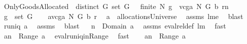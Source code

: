 \begin{isabellebody}
\ OnlyGoodsAllocated{\isacharcolon}\ \ {\isachardoublequoteopen}distinct\ G{\isachardoublequoteclose}\ {\isachardoublequoteopen}set\ G\ {\isasymnoteq}\ {\isacharbraceleft}{\isacharbraceright}{\isachardoublequoteclose}\ {\isachardoublequoteopen}finite\ N{\isachardoublequoteclose}\ {\isachardoublequoteopen}g\ {\isasymin}\ {\isacharparenleft}vcga\ N\ G\ b\ r{\isacharparenright}{\isacharcomma}{\isacharcomma}{\isacharcomma}n{\isachardoublequoteclose}\ \isanewline
{}\ {\isachardoublequoteopen}g\ {\isasymin}\ set\ G{\isachardoublequoteclose}\isanewline
%
\isadelimproof
%
\endisadelimproof
%
\isatagproof
{}\isamarkupfalse%
\ {\isacharminus}\ \isanewline
{}\isamarkupfalse%
\ {\isacharquery}a{\isacharequal}{\isachardoublequoteopen}vcga{\isacharprime}\ N\ G\ b\ r{\isachardoublequoteclose}\ \isamarkupfalse%
\ {\isachardoublequoteopen}{\isacharquery}a\ {\isasymin}\ allocationsUniverse{\isachardoublequoteclose}\ \isamarkupfalse%
\ assms{\isacharparenleft}{}{\isacharcomma}{}{\isacharcomma}{}{\isacharparenright}\ lm{}{}e\ \isamarkupfalse%
\ blast\isanewline
{}\isamarkupfalse%
\ \isamarkupfalse%
\ {\isachardoublequoteopen}runiq\ {\isacharquery}a{\isachardoublequoteclose}\ \isamarkupfalse%
\ assms{\isacharparenleft}{}{\isacharcomma}{}{\isacharcomma}{}{\isacharparenright}\ \isamarkupfalse%
\ blast\isanewline
{}\isamarkupfalse%
\ \isamarkupfalse%
\ {\isachardoublequoteopen}n\ {\isasymin}\ Domain\ {\isacharquery}a{\isachardoublequoteclose}\ \isamarkupfalse%
\ assms\ eval{\isacharunderscore}rel{\isacharunderscore}def\ lm{}{}{}\ \isamarkupfalse%
\ fast\isanewline
{}\isamarkupfalse%
\ \isamarkupfalse%
\ \isamarkupfalse%
\ {\isachardoublequoteopen}{\isacharquery}a{\isacharcomma}{\isacharcomma}n\ {\isasymin}\ Range\ {\isacharquery}a{\isachardoublequoteclose}\ \isamarkupfalse%
\ eval{\isacharunderscore}runiq{\isacharunderscore}in{\isacharunderscore}Range\ \isamarkupfalse%
\ fast\ \isanewline
{}\isamarkupfalse%
\ \isamarkupfalse%
\ {\isachardoublequoteopen}{\isacharquery}a{\isacharcomma}{\isacharcomma}{\isacharcomma}n\ {\isasymin}\ Range\ {\isacharquery}a{\isachardoublequoteclose}\ \isamarkupfalse%

\end{isabellebody}
